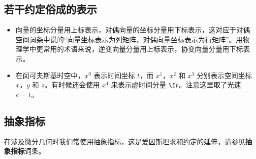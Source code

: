 \subsection{若干约定俗成的表示}
\begin{itemize}
\item 向量的坐标分量用上标表示，对偶向量的坐标分量用下标表示，这对应于对偶空间词条中说的“向量坐标表示为列矩阵，对偶向量坐标表示为行矩阵”。用物理学中更常用的术语来说，逆变向量分量用上标表示，协变向量分量用下标表示。

\item 在闵可夫斯基时空中，$x^0$ 表示时间坐标 $t$，而 $x^1$，$x^2$ 和 $x^3$ 分别表示空间坐标 $x$，$y$ 和 $z$。有时候还会使用 $x^4$ 来表示虚时间分量 $\I t$。注意这里取了光速 $c=1$。




\end{itemize}







\subsection{抽象指标}

在涉及微分几何时我们常使用抽象指标，这是爱因斯坦求和约定的延伸，请参见\textbf{抽象指标}词条。




